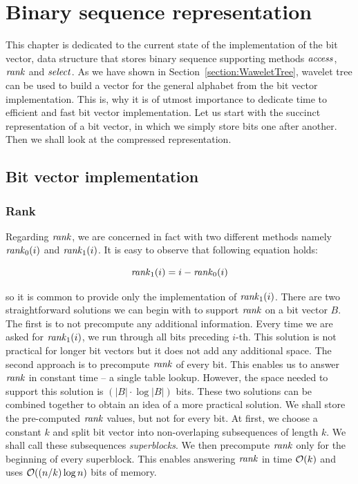\chapter{Binary sequence representation}
\label{kap:kap2}

This chapter is dedicated to the current state of the implementation of the bit vector, data
structure that stores binary sequence supporting methods $\mathit{access}$, $\mathit{rank}$ and $\mathit{select}$. As we have
shown in Section~\ref{section:WaweletTree}, wavelet tree can be used to build a vector
for the general alphabet from the bit vector implementation. This is, why it is of utmost
importance to dedicate time to efficient and fast bit vector implementation. Let us start with
the succinct representation of a bit vector, in which we simply store bits one after another.
Then we shall look at the compressed representation.

\section{Bit vector implementation}

\subsection{Rank}
\label{section:rank}

Regarding $\mathit{rank}$, we are concerned in fact with two different methods namely $\mathit{rank}_0(i)$ and
$\mathit{rank}_1(i)$. It is easy to observe that following equation holds:

                    $$\mathit{rank}_1(i) = i - \mathit{rank}_0(i)$$

so it is common to provide only the implementation of $\mathit{rank}_1(i)$.
There are two straightforward solutions we can begin with to support $\mathit{rank}$ on a bit vector
$B$. The first is to not precompute any additional information. Every time we are asked
for $\mathit{rank}_1(i)$, we run through all bits preceding $i$-th. This solution is not
practical for longer bit vectors but it does not add any additional space. The second
approach is to precompute $\mathit{rank}$ of every bit. This enables us to answer $\mathit{rank}$ in constant
time -- a single table lookup. However, the space needed to support this
solution is $(|B|\cdot\log |B|)$ bits. These two solutions can be combined together to obtain an
idea of a more practical solution. We shall store the pre-computed $\mathit{rank}$ values, but not for every
bit. At first, we choose a constant $k$ and split bit vector into non-overlaping subsequences
of length $k$. We shall call these subsequences \textit{superblocks}. We then precompute $\mathit{rank}$
only for the beginning of every superblock. This enables answering $\mathit{rank}$ in time $\mathcal{O}(k)$ and
uses $\mathcal{O}((n/k)\log n)$ bits of memory.

